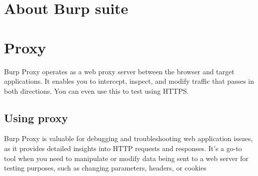 \documentclass[
	a4paper, %
	12pt, %
]{CSSullivanBusinessReport}
\begin{document}
\newpage


\begin{twothirdswidth} %
	\tableofcontents %
\end{twothirdswidth}

\newpage


\section*{About Burp suite} %



\section*{Proxy} %

Burp Proxy operates as a web proxy server between the browser and target applications. It enables you to intercept, inspect, and modify traffic that passes in both directions. You can even use this to test using HTTPS.

\subsection*{Using proxy}

\begin{fullwidth}
    Burp Proxy is valuable for debugging and troubleshooting web application issues, as it provides detailed insights into HTTP requests and responses. It's a go-to tool when you need to manipulate or modify data being sent to a web server for testing purposes, such as changing parameters, headers, or cookies
\end{fullwidth}
\end{document}
